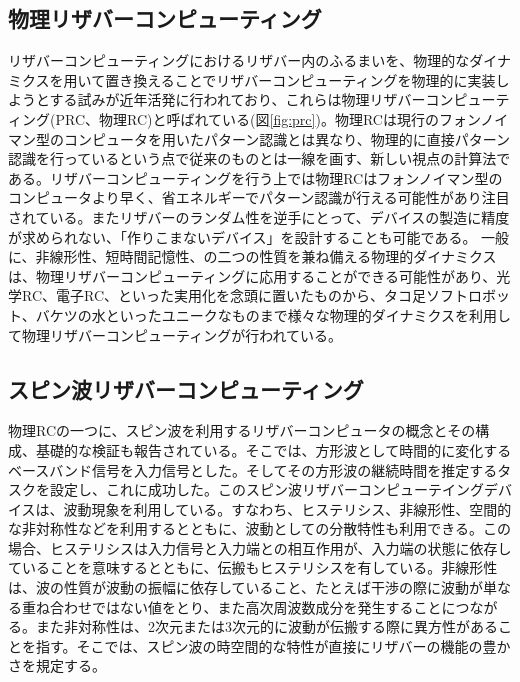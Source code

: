 \documentclass[a4j, twocolumn]{jsarticle}
\begin{document}
\subsection{物理リザバーコンピューティング}
リザバーコンピューティングにおけるリザバー内のふるまいを、物理的なダイナミクスを用いて置き換えることでリザバーコンピューティングを物理的に実装しようとする試みが近年活発に行われており、これらは物理リザバーコンピューティング(PRC、物理RC)と呼ばれている(図\ref{fig:prc})。物理RCは現行のフォンノイマン型のコンピュータを用いたパターン認識とは異なり、物理的に直接パターン認識を行っているという点で従来のものとは一線を画す、新しい視点の計算法である。リザバーコンピューティングを行う上では物理RCはフォンノイマン型のコンピュータより早く、省エネルギーでパターン認識が行える可能性があり注目されている。またリザバーのランダム性を逆手にとって、デバイスの製造に精度が求められない、「作りこまないデバイス」を設計することも可能である\cite{ahirose2019J_IEICE:_prosp_for_reser_compu}。
一般に、非線形性、短時間記憶性、の二つの性質を兼ね備える物理的ダイナミクスは、物理リザバーコンピューティングに応用することができる可能性があり、光学RC\cite{opt,Larger2017}、電子RC\cite{YI2016175}、といった実用化を念頭に置いたものから、タコ足ソフトロボット\cite{Nakajima2015SciReo:_infor_proce_via_physi_soft_body}、バケツの水\cite{Fernando2003AL:_patter_recog_in_a_bucke}といったユニークなものまで様々な物理的ダイナミクスを利用して物理リザバーコンピューティングが行われている\cite{tanaka2018recent}。


\subsection{スピン波リザバーコンピューティング}
物理RCの一つに、スピン波を利用するリザバーコンピュータの概念とその構成、基礎的な検証も報告されている\cite{Nakane2018IEEEAccess:_Reser_Compu_with_spin_waves_Excit_in_a_Garne_film,Nakane2018ICM:_demon_of_spin_wave_based_reser_compu_for_next_gener_machi_learn_devic}。そこでは、方形波として時間的に変化するベースバンド信号を入力信号とした。そしてその方形波の継続時間を推定するタスクを設定し、これに成功した。このスピン波リザバーコンピューテイングデバイスは、波動現象を利用している。すなわち、ヒステリシス、非線形性、空間的な非対称性などを利用するとともに、波動としての分散特性も利用できる。この場合、ヒステリシスは入力信号と入力端との相互作用が、入力端の状態に依存していることを意味するとともに、伝搬もヒステリシスを有している。非線形性は、波の性質が波動の振幅に依存していること、たとえば干渉の際に波動が単なる重ね合わせではない値をとり、また高次周波数成分を発生することにつながる。また非対称性は、2次元または3次元的に波動が伝搬する際に異方性があることを指す。そこでは、スピン波の時空間的な特性が直接にリザバーの機能の豊かさを規定する。
\end{document}
